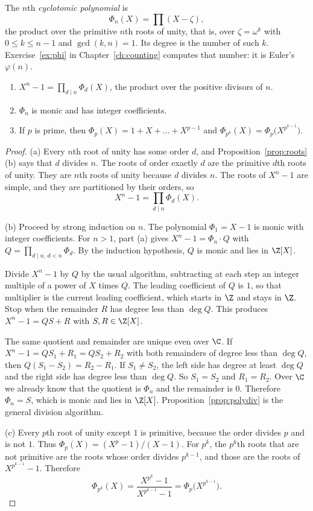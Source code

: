\begin{definition}\label{def:cyclotomic}
The $n$th \emph{cyclotomic polynomial} is
\[
\Phi_n(X)=\prod(X-\zeta),
\]
the product over the primitive $n$th roots of unity, that is, over $\zeta=\omega^k$ with $0\le k\le n-1$ and $\gcd(k,n)=1$. Its degree is the number of such $k$. Exercise~\ref{ex:phi} in Chapter~\ref{ch:counting} computes that number: it is Euler's $\varphi(n)$.
\end{definition}

\begin{proposition}\label{prop:cyclotomic}
\begin{enumerate}[label=(\alph*)]
\item $X^n-1=\prod_{d\mid n}\Phi_d(X)$, the product over the positive divisors of $n$.
\item $\Phi_n$ is monic and has integer coefficients.
\item If $p$ is prime, then $\Phi_p(X)=1+X+\dots+X^{p-1}$ and $\Phi_{p^k}(X)=\Phi_p\bigl(X^{p^{k-1}}\bigr)$.
\end{enumerate}
\end{proposition}
\begin{proof}
(a) Every $n$th root of unity has some order $d$, and Proposition~\ref{prop:roots}(b) says that $d$ divides $n$. The roots of order exactly $d$ are the primitive $d$th roots of unity. They are $n$th roots of unity because $d$ divides $n$. The roots of $X^n-1$ are simple, and they are partitioned by their orders, so
\[
X^n-1=\prod_{d\mid n}\Phi_d(X).
\]

(b) Proceed by strong induction on $n$. The polynomial $\Phi_1=X-1$ is monic with integer coefficients. For $n>1$, part (a) gives $X^n-1=\Phi_n\cdot Q$ with $Q=\prod_{d\mid n,\,d<n}\Phi_d$. By the induction hypothesis, $Q$ is monic and lies in $\Z[X]$.

Divide $X^n-1$ by $Q$ by the usual algorithm, subtracting at each step an integer multiple of a power of $X$ times $Q$. The leading coefficient of $Q$ is $1$, so that multiplier is the current leading coefficient, which starts in $\Z$ and stays in $\Z$. Stop when the remainder $R$ has degree less than $\deg Q$. This produces $X^n-1=QS+R$ with $S,R\in\Z[X]$.

The same quotient and remainder are unique even over $\C$. If $X^n-1=QS_1+R_1=QS_2+R_2$ with both remainders of degree less than $\deg Q$, then $Q(S_1-S_2)=R_2-R_1$. If $S_1\ne S_2$, the left side has degree at least $\deg Q$ and the right side has degree less than $\deg Q$. So $S_1=S_2$ and $R_1=R_2$. Over $\C$ we already know that the quotient is $\Phi_n$ and the remainder is $0$. Therefore $\Phi_n=S$, which is monic and lies in $\Z[X]$. Proposition~\ref{prop:polydiv} is the general division algorithm.

(c) Every $p$th root of unity except $1$ is primitive, because the order divides $p$ and is not $1$. Thus $\Phi_p(X)=(X^p-1)/(X-1)$. For $p^k$, the $p^k$th roots that are not primitive are the roots whose order divides $p^{k-1}$, and those are the roots of $X^{p^{k-1}}-1$. Therefore
\[
\Phi_{p^k}(X)=\frac{X^{p^k}-1}{X^{p^{k-1}}-1}=\Phi_p\bigl(X^{p^{k-1}}\bigr).
\]
\end{proof}

